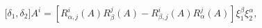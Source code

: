 \begin{equation*}
\lbrack \delta _{1},\delta _{2}]A^{i}=\left[ R_{\alpha ,j}^{i}(A)R_{\beta
}^{j}(A)-R_{\beta ,j}^{i}(A)R_{\alpha }^{j}(A)\right] \xi _{1}^{\beta }\xi
_{2}^{\alpha },
\end{equation*}

